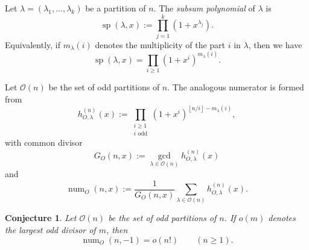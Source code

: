 \documentclass[12pt]{amsart}
\newtheorem{conjecture}{Conjecture}
\DeclareMathOperator{\spol}{sp}
\DeclareMathOperator{\num}{num}
\newcommand{\floor}[1]{\left\lfloor #1\right\rfloor}
\newcommand{\OO}{\mathcal O}
\begin{document}
Let \(\lambda=(\lambda_1,\ldots,\lambda_k)\) be a partition of \(n\).  The
\emph{subsum polynomial} of \(\lambda\) is
\begin{equation}
   \spol(\lambda,x):=\prod_{j=1}^k(1+x^{\lambda_j}).
\end{equation}
Equivalently, if \(m_\lambda(i)\) denotes the multiplicity of the part \(i\) in
\(\lambda\), then we have
\[
   \spol(\lambda,x)=\prod_{i\ge1}(1+x^i)^{m_\lambda(i)}.
\]

Let \(\OO(n)\) be the set of odd partitions of \(n\).  The analogous numerator is
formed from
\[
   h_{O,\lambda}^{(n)}(x)
   :=\prod_{\substack{i\ge1\\ i\text{ odd}}}
      (1+x^i)^{\floor{n/i}-m_\lambda(i)},
\]
with common divisor
\[
   G_O(n,x):=\gcd_{\lambda\in\OO(n)}h_{O,\lambda}^{(n)}(x)
\]
and
\[
   \num_O(n,x):=\frac{1}{G_O(n,x)}
   \sum_{\lambda\in\OO(n)}h_{O,\lambda}^{(n)}(x).
\]

\begin{conjecture}\label{conj:conj8}  Let \(\OO(n)\) be the set of odd partitions of \(n\).  If \(o(m)\) denotes
the largest odd divisor of \(m\), then
\[
   \num_O(n,-1)=o(n!)\qquad(n\ge1).
\]
\end{conjecture}
\end{document}

